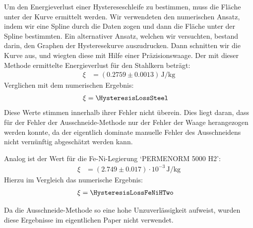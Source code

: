 \documentclass[a4paper,10pt,twocolumn]{article}
\begin{document}
    Um den Energieverlust einer Hystereseschleife zu bestimmen, muss die Fläche unter der Kurve ermittelt werden.
    Wir verwendeten den numerischen Ansatz, indem wir eine Spline durch die Daten zogen
    und dann die Fläche unter der Spline bestimmten.
    Ein alternativer Ansatz, welchen wir versuchten, bestand darin, den Graphen der Hysteresekurve auszudrucken.
    Dann schnitten wir die Kurve aus, und wiegten diese mit Hilfe einer Präzisionswaage.
    Der mit dieser Methode ermittelte Energieverlust für den Stahlkern beträgt:
    \begin{align*}
        \xi &= (0.2759 \pm 0.0013) \, \text{J/kg}
    \end{align*}
    Verglichen mit dem numerischen Ergebnis:
    \begin{align*}
        \xi &= \HysteresisLossSteel
    \end{align*}
    Diese Werte stimmen innerhalb ihrer Fehler nicht überein.
    Dies liegt daran, dass für der Fehler der Ausschneide-Methode nur der Fehler der Waage herangezogen werden konnte,
    da der eigentlich dominate manuelle Fehler des Ausschneidens nicht vernünftig abgeschätzt werden kann.
    
    Analog ist der Wert für die Fe-Ni-Legierung `PERMENORM 5000 H2':
    \begin{align*}
        \xi &= (2.749 \pm 0.017) \cdot 10^{-3} \, \text{J/kg}
    \end{align*}
    Hierzu im Vergleich das numerische Ergebnis:
    \begin{align*}
        \xi &= \HysteresisLossFeNiHTwo
    \end{align*}
    
    Da die Ausschneide-Methode so eine hohe Unzuverlässigkeit aufweist, wurden diese Ergebnisse im eigentlichen Paper
    nicht verwendet.
    
    
\end{document}
